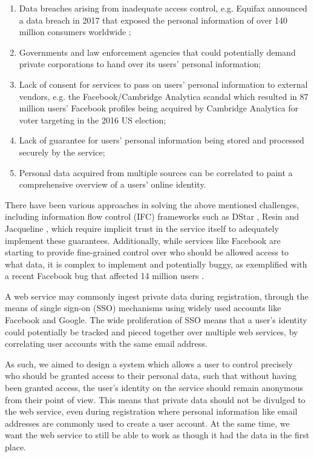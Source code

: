 \documentclass[letterpaper,twocolumn,10pt]{article}
\begin{document}
\begin{enumerate}
    \item Data breaches arising from inadequate access control, e.g. Equifax announced a data
          breach in 2017 that exposed the personal information of over 140 million consumers
          worldwide \cite{OBrien:2017};
    \item Governments and law enforcement agencies that could potentially demand private
          corporations to hand over its users' personal information;
    \item Lack of consent for services to pass on users' personal information to external vendors,
          e.g. the Facebook/Cambridge Analytica scandal which resulted in 87 million users' Facebook
          profiles being acquired by Cambridge Analytica for voter targeting in the 2016 US
          election;
    \item Lack of guarantee for users' personal information being stored and processed securely by
          the service;
    \item Personal data acquired from multiple sources can be correlated to paint a comprehensive
          overview of a users' online identity.
\end{enumerate}

There have been various approaches in solving the above mentioned challenges, including information flow control (IFC) frameworks such as DStar \cite{Zeldovich:2008:SDS:1387589.1387610}, Resin \cite{Yip:2009:IAS:1629575.1629604} and Jacqueline \cite{Yang:2016:PDI:2980983.2908098}, which require implicit trust in the service itself to adequately implement these guarantees. Additionally, while services like Facebook are starting to provide fine-grained control over who should be allowed access to what data, it is complex to implement and potentially buggy, as exemplified with a recent Facebook bug that affected 14 million users \cite{Sheera:2018}.

A web service may commonly ingest private data during registration, through the means of single sign-on (SSO) mechanisms using widely used accounts like Facebook and Google. The wide proliferation of SSO means that a user's identity could potentially be tracked and pieced together over multiple web services, by correlating user accounts with the same email address.

As such, we aimed to design a system which allows a user to control precisely who should be granted access to their personal data, such that without having been granted access, the user's identity on the service should remain anonymous from their point of view. This means that private data should not be divulged to the web service, even during registration where personal information like email addresses are commonly used to create a user account. At the same time, we want the web service to still be able to work as though it had the data in the first place.
\end{document}
